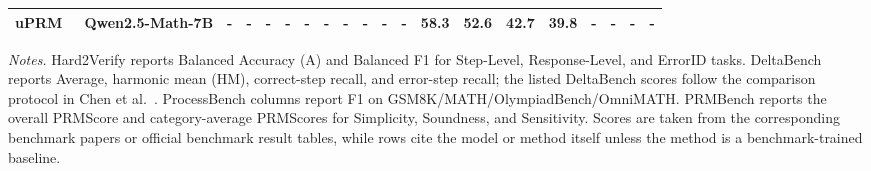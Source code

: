 \begin{table}[H]
{\begin{tabular}{@{} l|l|cccccc|cccc|cccc|cccc @{}}
uPRM~\cite{gadetsky2026uprm} & Qwen2.5-Math-7B & - & - & - & - & - & - & - & - & - & - & 58.3 & 52.6 & 42.7 & 39.8 & - & - & - & - \\
\bottomrule
\end{tabular}
}
\vspace{2pt}
\noindent\parbox{\linewidth}{\normalsize \textit{Notes.} Hard2Verify reports Balanced Accuracy (A) and Balanced F1 for Step-Level, Response-Level, and ErrorID tasks. DeltaBench reports Average, harmonic mean (HM), correct-step recall, and error-step recall; the listed DeltaBench scores follow the comparison protocol in Chen et al.~\cite{chen2025spc}. ProcessBench columns report F1 on GSM8K/MATH/OlympiadBench/OmniMATH. PRMBench reports the overall PRMScore and category-average PRMScores for Simplicity, Soundness, and Sensitivity. Scores are taken from the corresponding benchmark papers or official benchmark result tables, while rows cite the model or method itself unless the method is a benchmark-trained baseline.}
\end{table}
